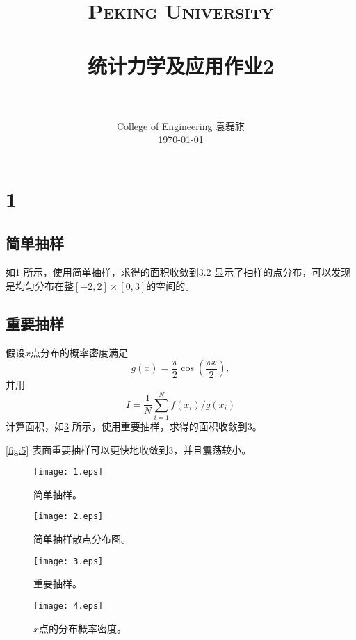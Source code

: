 \documentclass[12pt]{article}
\title{
		\vspace{-1in} 	
		\usefont{OT1}{bch}{b}{n}
		\normalfont \normalsize \textsc{\LARGE Peking University}\\[1cm] %
		\horrule{0.5pt} \\[0.5cm]
		\huge \bfseries{统计力学及应用作业2} \\
		\horrule{2pt} \\[0.5cm]
}
\author{
		\normalfont 								\normalsize
		College of Engineering \quad 2001111690  \quad 袁磊祺\\	\normalsize
        \today
}
\date{}
\begin{document}


\maketitle

\section{1}

\subsection{简单抽样}

如\cref{fig:1} 所示，使用简单抽样，求得的面积收敛到3.\cref{fig:2} 显示了抽样的点分布，可以发现是均匀分布在整$[-2,2]\times [0,3]$的空间的。

\subsection{重要抽样}

假设$x$点分布的概率密度满足
\begin{equation}
	g(x) = \frac{\pi}{2} \cos \left(\frac{\pi x}{2}\right),
\end{equation}
并用
\begin{equation}
	I = \frac{1}{N} \sum_{i=1}^N f(x_i)/g(x_i)
\end{equation}
计算面积，如\cref{fig:3} 所示，使用重要抽样，求得的面积收敛到3。

\cref{fig:5} 表面重要抽样可以更快地收敛到3，并且震荡较小。

\begin{figure}[htp]
	\centering
	\texttt{[image: 1.eps]}
	\caption{简单抽样。}
	\label{fig:1}
\end{figure}

\begin{figure}[htp]
	\centering
	\texttt{[image: 2.eps]}
	\caption{简单抽样散点分布图。}
	\label{fig:2}
\end{figure}


\begin{figure}[htp]
	\centering
	\texttt{[image: 3.eps]}
	\caption{重要抽样。}
	\label{fig:3}
\end{figure}


\begin{figure}[htp]
	\centering
	\texttt{[image: 4.eps]}
	\caption{$x$点的分布概率密度。}
	\label{fig:4}
\end{figure}
\end{document}
